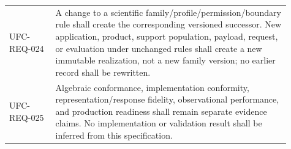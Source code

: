 \begin{longtable}{p{0.15\linewidth}p{0.76\linewidth}}
UFC-REQ-024 & A change to a scientific family/profile/permission/boundary rule
shall create the corresponding versioned successor. New application, product,
support population, payload, request, or evaluation under unchanged rules
shall create a new immutable realization, not a new family version; no earlier
record shall be rewritten.\\
UFC-REQ-025 & Algebraic conformance, implementation conformity,
representation/response fidelity, observational performance, and production
readiness shall remain separate evidence claims. No implementation or
validation result shall be inferred from this specification.\\
\bottomrule
\end{longtable}

\fi
